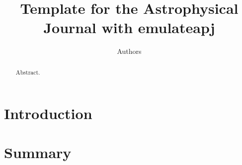 \documentclass[iop,apj,tighten]{emulateapj}
\begin{document}
\title{Template for the Astrophysical Journal with emulateapj}
\author{Authors}

\begin{abstract}
Abstract.
\end{abstract}

\maketitle

\section{Introduction}

\section{Summary}



%
\end{document}
